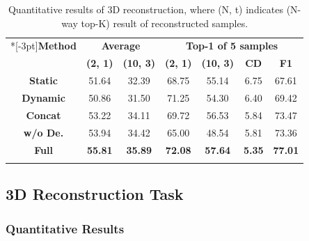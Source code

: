 \begin{table}[]
	\centering
	\renewcommand\arraystretch{1.0}
	\footnotesize
	\begin{tabular}{ c c c  c  c  c  c}
		\Xhline{2\arrayrulewidth}
		
		\multirow{2}*[-3pt]{\textbf{Method}} \rule{0pt}{2pt} & \multicolumn{2}{c}{\multirow{1}{*}[-1pt]{\textbf{\textbf{Average}}}}
		& \multicolumn{4}{c}{\multirow{1}{*}[-1pt]{\textbf{\textbf{Top-1 of 5 samples}}}}  \\ [-1.5pt]
		\cmidrule(l{5pt}r{5pt}){2-3}\cmidrule(l{5pt}r{5pt}){4-7}
		& \multirow{1}{*}[0.8pt]{\textbf{(2, 1)}} & \multirow{1}{*}[0.8pt]{\textbf{(10, 3)}}  & \multirow{1}{*}[0.8pt]{\textbf{(2, 1)}} 
		& \multirow{1}{*}[0.8pt]{\textbf{(10, 3)}} & \multirow{1}{*}[0.8pt]{\textbf{CD}} & \multirow{1}{*}[0.8pt]{\textbf{F1}}\\
		\hline
		\textbf{Static} & 51.64 & 32.39 & 68.75  & 55.14 & 6.75 & 67.61 \\
		\textbf{Dynamic} & 50.86 & 31.50 & 71.25 & 54.30 & 6.40 & 69.42 \\
		\textbf{Concat} & 53.22 & 34.11 & 69.72 & 56.53 & 5.84 & 73.47 \\
		\textbf{w/o De.} & 53.94  & 34.42 & 65.00 & 48.54 & 5.81 & 73.36 \\
		\textbf{Full} & \textbf{55.81}  & \textbf{35.89} & \textbf{72.08} & \textbf{57.64} & \textbf{5.35} & \textbf{77.01} \\
		\Xhline{2\arrayrulewidth}
	\end{tabular}
	\caption{Quantitative results of 3D reconstruction, where (N, t) indicates (N-way top-K) result of reconstructed samples.}
	\label{tab-recon}
	\vspace{-0.2cm}
\end{table}


\subsection{3D Reconstruction Task}

\subsubsection{Quantitative Results}

